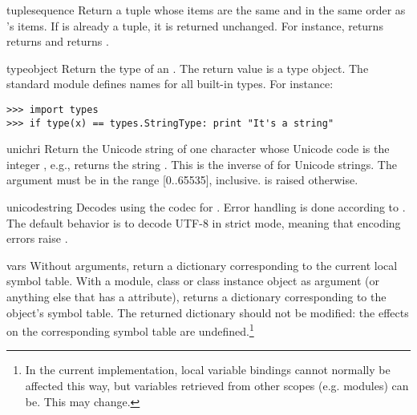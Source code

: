 \begin{funcdesc}{tuple}{sequence}
Return a tuple whose items are the same and in the same order as
's items.  If  is already a tuple, it
is returned unchanged.  For instance,  returns
returns  and  returns
.
\end{funcdesc}

\begin{funcdesc}{type}{object}
Return the type of an .  The return value is a type
object.  The standard module  defines names for all
built-in types.
For instance:

\begin{verbatim}
>>> import types
>>> if type(x) == types.StringType: print "It's a string"
\end{verbatim}
\end{funcdesc}

\begin{funcdesc}{unichr}{i}
Return the Unicode string of one character whose Unicode code is the
integer , e.g.,  returns the string
.  This is the inverse of  for Unicode
strings.  The argument must be in the range [0..65535], inclusive.
 is raised otherwise.
\end{funcdesc}

\begin{funcdesc}{unicode}{string}
Decodes  using the codec for .  Error
handling is done according to .  The default behavior is
to decode UTF-8 in strict mode, meaning that encoding errors raise
.
\end{funcdesc}

\begin{funcdesc}{vars}{}
Without arguments, return a dictionary corresponding to the current
local symbol table.  With a module, class or class instance object as
argument (or anything else that has a  attribute),
returns a dictionary corresponding to the object's symbol table.
The returned dictionary should not be modified: the effects on the
corresponding symbol table are undefined.\footnote{
  In the current implementation, local variable bindings cannot
  normally be affected this way, but variables retrieved from 
  other scopes (e.g. modules) can be.  This may change.}
\end{funcdesc}

